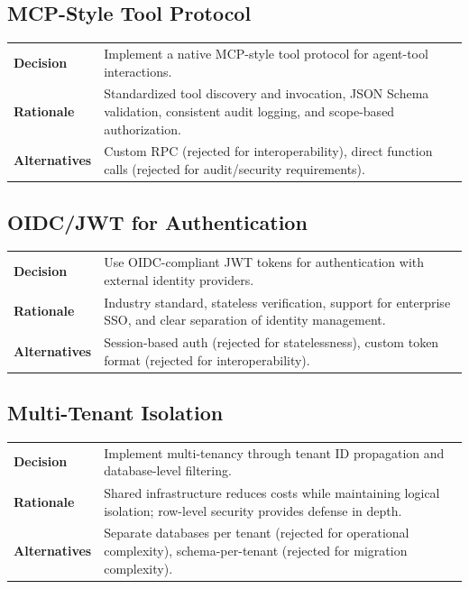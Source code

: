 \subsection{MCP-Style Tool Protocol}

\begin{table}[ht]
\centering
\small
\begin{tabularx}{\textwidth}{lX}
    \hline
    \textbf{Decision} & Implement a native MCP-style tool protocol for agent-tool interactions. \\
    \textbf{Rationale} & Standardized tool discovery and invocation, JSON Schema validation, consistent audit logging, and scope-based authorization. \\
    \textbf{Alternatives} & Custom RPC (rejected for interoperability), direct function calls (rejected for audit/security requirements). \\
    \hline
\end{tabularx}
\end{table}

\subsection{OIDC/JWT for Authentication}

\begin{table}[ht]
\centering
\small
\begin{tabularx}{\textwidth}{lX}
    \hline
    \textbf{Decision} & Use OIDC-compliant JWT tokens for authentication with external identity providers. \\
    \textbf{Rationale} & Industry standard, stateless verification, support for enterprise SSO, and clear separation of identity management. \\
    \textbf{Alternatives} & Session-based auth (rejected for statelessness), custom token format (rejected for interoperability). \\
    \hline
\end{tabularx}
\end{table}

\subsection{Multi-Tenant Isolation}

\begin{table}[ht]
\centering
\small
\begin{tabularx}{\textwidth}{lX}
    \hline
    \textbf{Decision} & Implement multi-tenancy through tenant ID propagation and database-level filtering. \\
    \textbf{Rationale} & Shared infrastructure reduces costs while maintaining logical isolation; row-level security provides defense in depth. \\
    \textbf{Alternatives} & Separate databases per tenant (rejected for operational complexity), schema-per-tenant (rejected for migration complexity). \\
    \hline
\end{tabularx}
\end{table}

